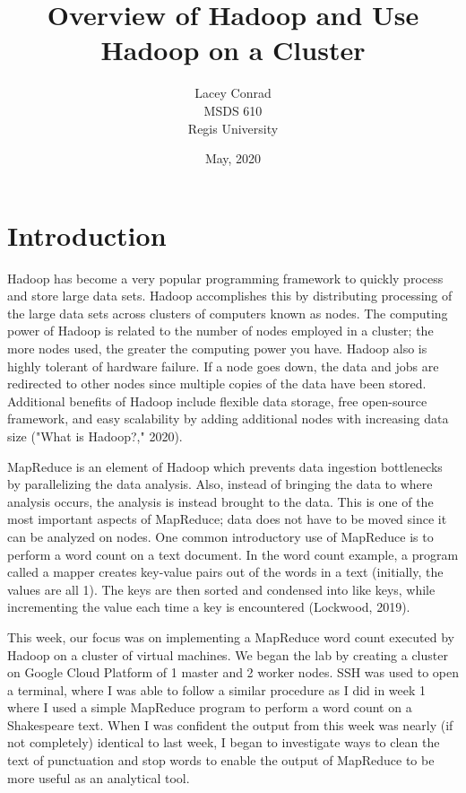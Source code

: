 \documentclass[]{article}
\title{Overview of Hadoop and Use Hadoop on a Cluster}
\author{Lacey Conrad\\MSDS 610\\ Regis University}
\date{May, 2020}
\begin{document}
	\maketitle
	
\section{Introduction}
Hadoop has become a very popular programming framework to quickly process and store large data sets.  Hadoop accomplishes this by distributing processing of the large data sets across clusters of computers known as nodes.  The computing power of Hadoop is related to the number of nodes employed in a cluster; the more nodes used, the greater the computing power you have.  Hadoop also is highly tolerant of hardware failure.  If a node goes down, the data and jobs are redirected to other nodes since multiple copies of the data have been stored.  Additional benefits of Hadoop include flexible data storage, free open-source framework, and easy scalability by adding additional nodes with increasing data size ("What is Hadoop?," 2020).    

MapReduce is an element of Hadoop which prevents data ingestion bottlenecks by parallelizing the data analysis.  Also, instead of bringing the data to where analysis occurs, the analysis is instead brought to the data.  This is one of the most important aspects of MapReduce; data does not have to be moved since it can be analyzed on nodes.  One common introductory use of MapReduce is to perform a word count on a text document.  In the word count example, a program called a mapper creates key-value pairs out of the words in a text (initially, the values are all 1).  The keys are then sorted and condensed into like keys, while incrementing the value each time a key is encountered (Lockwood, 2019).

This week, our focus was on implementing a MapReduce word count executed by Hadoop on a cluster of virtual machines.  We began the lab by creating a cluster on Google Cloud Platform of 1 master and 2 worker nodes.  SSH was used to open a terminal, where I was able to follow a similar procedure as I did in week 1 where I used a simple MapReduce program to perform a word count on a Shakespeare text.  When I was confident the output from this week was nearly (if not completely) identical to last week, I began to investigate ways to clean the text of punctuation and stop words to enable the output of MapReduce to be more useful as an analytical tool.  
\end{document}
